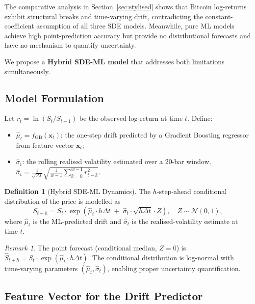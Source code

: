 \documentclass[12pt, a4paper, oneside]{report}
\theoremstyle{plain}
\theoremstyle{definition}
\newtheorem{definition}[theorem]{Definition}
\theoremstyle{remark}
\newtheorem{remark}[theorem]{Remark}
\begin{document}
The comparative analysis in Section~\ref{sec:stylised} shows that Bitcoin
log-returns exhibit structural breaks and time-varying drift, contradicting the
constant-coefficient assumption of all three SDE models.  Meanwhile, pure ML
models achieve high point-prediction accuracy but provide no distributional
forecasts and have no mechanism to quantify uncertainty.

We propose a \textbf{Hybrid SDE-ML model} that addresses both limitations
simultaneously.

\subsection{Model Formulation}

Let $r_t = \ln(S_t / S_{t-1})$ be the observed log-return at time $t$.  Define:
\begin{itemize}[leftmargin=1.25cm]
  \item $\hat\mu_t = f_{\text{GB}}(\mathbf{x}_t)$: the one-step drift predicted
    by a Gradient Boosting regressor from feature vector $\mathbf{x}_t$;
  \item $\hat\sigma_t$: the rolling realised volatility estimated over a 20-bar
    window, $\hat\sigma_t = \frac{1}{\sqrt{\Delta t}}\sqrt{\frac{1}{w-1}\sum_{k=0}^{w-1}r_{t-k}^2}$.
\end{itemize}

\begin{definition}[Hybrid SDE-ML Dynamics]
\label{def:hybrid}
The $h$-step-ahead conditional distribution of the price is modelled as
\begin{equation}
\label{eq:hybrid}
  S_{t+h} = S_t \cdot \exp\!\left(
    \hat\mu_t \cdot h\Delta t
    \;+\; \hat\sigma_t \cdot \sqrt{h\Delta t} \cdot Z
  \right), \quad Z \sim \mathcal{N}(0,1),
\end{equation}
where $\hat\mu_t$ is the ML-predicted drift and $\hat\sigma_t$ is the
realised-volatility estimate at time $t$.
\end{definition}

\begin{remark}
The point forecast (conditional median, $Z = 0$) is
$\hat S_{t+h} = S_t \cdot \exp(\hat\mu_t \cdot h\Delta t)$.
The conditional distribution is log-normal with time-varying parameters
$(\hat\mu_t, \hat\sigma_t)$, enabling proper uncertainty quantification.
\end{remark}

\subsection{Feature Vector for the Drift Predictor}
\end{document}
